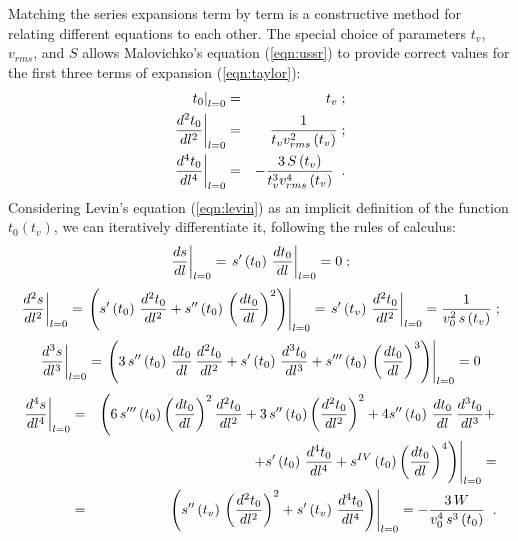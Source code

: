 Matching the series expansions term by term is a constructive method
for relating different equations to each other. The special choice of
parameters $t_v$, $v_{rms}$, and $S$ allows Malovichko's equation
(\ref{eqn:ussr}) to provide correct values for the first three terms
of expansion (\ref{eqn:taylor}):
\begin{eqnarray}
\left.t_0\right|_{l=0} & = & t_v\;;
\label{eqn:mal0}\\
\left.{d^2t_0}\over {dl^2}\right|_{l=0} & = &
{1 \over {t_v v_{rms}^2\left(t_v\right)}}\;;
\label{eqn:mal2}\\
\left.{d^4t_0}\over {dl^4}\right|_{l=0} & = &
-{{3\,S\left(t_v\right)} \over {t_v^3 v_{rms}^4\left(t_v\right)}}\;\;.
\label{eqn:mal4}
\end{eqnarray}
Considering Levin's equation (\ref{eqn:levin}) as an implicit
definition of the function $t_0\left(t_v\right)$, we can iteratively
differentiate it, following the rules of calculus:
\begin{eqnarray*}
\left.{ds}\over {dl}\right|_{l=0} = 
\left. s'\left(t_0\right)\,{{dt_0}\over {dl}}\right|_{l=0}  =  0\;;
\end{eqnarray*}
\begin{equation}
\left.{d^2s}\over {dl^2}\right|_{l=0}  = 
\left.\left(s'\left(t_0\right)\,{{d^2t_0}\over {dl^2}}+
s''\left(t_0\right)\,\left({dt_0}\over {dl}\right)^2\right)\right|_{l=0} = 
\left. s'\left(t_v\right)\,{{d^2t_0}\over {dl^2}}\right|_{l=0}  = 
{1\over {v_0^2 \,s\left(t_v\right)}}\;;
\label{eqn:lev2}
\end{equation}
\begin{eqnarray*}
\left.{d^3s}\over {dl^3}\right|_{l=0}  = 
\left.\left(3\,s''\left(t_0\right)\,{{dt_0}\over {dl}}\,{{d^2t_0}\over {dl^2}}+
s'\left(t_0\right)\,{{d^3t_0}\over {dl^3}}+
s'''\left(t_0\right)\,\left({dt_0}\over {dl}\right)^3\right)\right|_{l=0}  =  0
\end{eqnarray*}
\begin{eqnarray}
\left.{d^4s}\over {dl^4}\right|_{l=0} & = &
\left(6\,s'''\left(t_0\right) \left({dt_0}\over {dl}\right)^2 
{{d^2t_0}\over {dl^2}}+
3\,s''\left(t_0\right) \left({d^2t_0}\over {dl^2}\right)^2 
+ 4s''\left(t_0\right)\,{{dt_0}\over {dl}}\,{{d^3t_0}\over {dl^3}}+ \right.
\nonumber \\  & &
\left. \left. + s'\left(t_0\right)\,{{d^4t_0}\over {dl^4}}+
s^{IV}\left(t_0\right) \left({dt_0}\over {dl}\right)^4\right)\right|_{l=0}  =
\nonumber \\ 
& = & \left.\left(s''\left(t_v\right)\,\left({d^2t_0}\over {dl^2}\right)^2+
s'\left(t_v\right)\,{{d^4t_0}\over {dl^4}}\right)\right|_{l=0}  = 
-{{3\,W} \over {v_0^4 \,s^3\left(t_0\right)}}\;\;.
\label{eqn:lev4}
\end{eqnarray}
